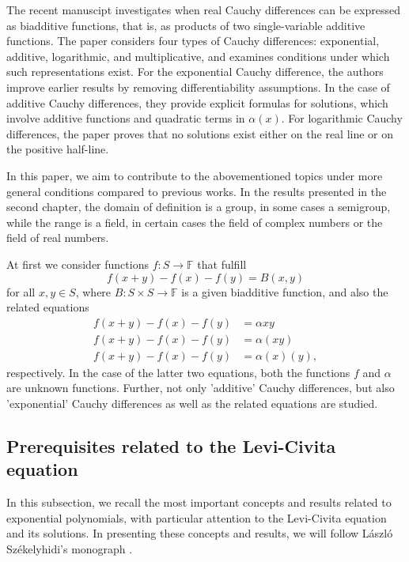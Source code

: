 \documentclass[a4paper,12pt]{article}
\theoremstyle{plain}
\theoremstyle{definition}
\theoremstyle{remark}
\begin{document}
The recent manuscipt \cite{MalMat25} investigates when real Cauchy differences can be expressed as biadditive functions, that is, as products of two single-variable additive functions. The paper considers four types of Cauchy differences: exponential, additive, logarithmic, and multiplicative, and examines conditions under which such representations exist.
For the exponential Cauchy difference, the authors improve earlier results by removing differentiability assumptions. In the case of additive Cauchy differences, they provide explicit formulas for solutions, which involve additive functions and quadratic terms in $\alpha(x)$. For logarithmic Cauchy differences, the paper proves that no solutions exist either on the real line or on the positive half-line.




In this paper, we aim to contribute to the abovementioned topics under more general conditions compared to previous works. In the results presented in the second chapter, the domain of definition is a group, in some cases a semigroup, while the range is a field, in certain cases the field of complex numbers or the field of real numbers.

At first we consider functions $f\colon S\to \mathbb{F}$ that fulfill 
\[
 f(x+y)-f(x)-f(y)= B(x, y)
\]
for all $x, y\in S$, where $B\colon S\times S\to \mathbb{F}$ is a given biadditive function, and also the related equations
\begin{align*}
 f(x+y)-f(x)-f(y)&= \alpha x y \\[2.5mm]
 f(x+y)-f(x)-f(y)&= \alpha (x y)\\[2.5mm]
 f(x+y)-f(x)-f(y)&= \alpha(x)(y),  
\end{align*}
respectively. 
In the case of the latter two equations, both the functions $f$ and $\alpha$ are unknown functions. 
Further, not only 'additive' Cauchy differences, but also 'exponential' Cauchy differences as well as  the related equations are studied. 

\subsection*{Prerequisites related to the Levi-Civita equation}


In this subsection, we recall the most important concepts and results related to exponential polynomials, with particular attention to the Levi-Civita equation and its solutions. In presenting these concepts and results, we will follow László Székelyhidi’s monograph \cite{Sze91}.
\end{document}
